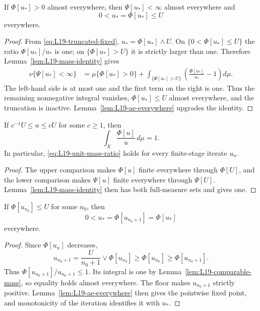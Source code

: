 \begin{lemma}\label{lem:L19-positive-implies-fixed}
If $\Phi[u_*]>0$ almost everywhere, then $\Psi[u_*]<\infty$ almost everywhere and
\[
 0<u_*=\Phi[u_*]\le U
\]
everywhere.
\end{lemma}
\begin{proof}
From \eqref{eq:L19-truncated-fixed}, $u_*=\Phi[u_*]\wedge U$.  On $\{0<\Phi[u_*]\le U\}$ the ratio $\Phi[u_*]/u_*$ is one; on $\{\Phi[u_*]>U\}$ it is strictly larger than one.  Therefore Lemma~\ref{lem:L19-mass-identity} gives
\begin{align*}
 \nu\{\Psi[u_*]<\infty\}
 &=\mu\{\Phi[u_*]>0\}
 +\int_{\{\Phi[u_*]>U\}}
   \left(\frac{\Phi[u_*]}{u_*}-1\right)d\mu.
\end{align*}
The left-hand side is at most one and the first term on the right is one.  Thus the remaining nonnegative integral vanishes, $\Phi[u_*]\le U$ almost everywhere, and the truncation is inactive.  Lemma~\ref{lem:L19-ae-everywhere} upgrades the identity.
\end{proof}

\begin{lemma}\label{lem:L19-comparable-mass}
If $c^{-1}U\le u\le cU$ for some $c\ge1$, then
\begin{equation}\label{eq:L19-unit-mass-ratio}
 \int_X\frac{\Phi[u]}u\,d\mu=1.
\end{equation}
In particular, \eqref{eq:L19-unit-mass-ratio} holds for every finite-stage iterate $u_n$.
\end{lemma}
\begin{proof}
The upper comparison makes $\Phi[u]$ finite everywhere through $\Phi[U]$, and the lower comparison makes $\Psi[u]$ finite everywhere through $\Psi[U]$.  Lemma~\ref{lem:L19-mass-identity} then has both full-measure sets and gives one.
\end{proof}

\begin{lemma}\label{lem:L19-one-iterate-below}
If $\Phi[u_{n_0}]\le U$ for some $n_0$, then
\[
 0<u_*=\Phi[u_{n_0+1}]=\Phi[u_*]
\]
everywhere.
\end{lemma}
\begin{proof}
Since $\Phi[u_n]$ decreases,
\[
 u_{n_0+1}=\frac{U}{n_0+1}\vee\Phi[u_{n_0}]
 \ge\Phi[u_{n_0}]
 \ge\Phi[u_{n_0+1}].
\]
Thus $\Phi[u_{n_0+1}]/u_{n_0+1}\le1$.  Its integral is one by Lemma~\ref{lem:L19-comparable-mass}, so equality holds almost everywhere.  The floor makes $u_{n_0+1}$ strictly positive.  Lemma~\ref{lem:L19-ae-everywhere} then gives the pointwise fixed point, and monotonicity of the iteration identifies it with $u_*$.
\end{proof}

